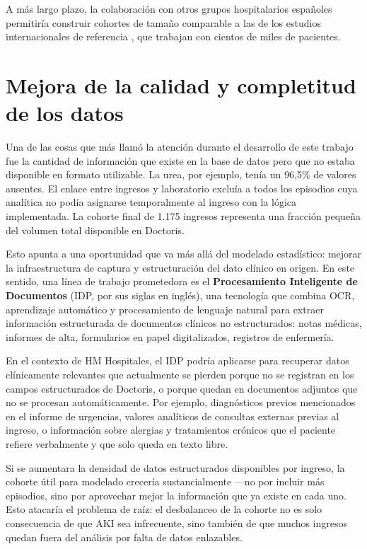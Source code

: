 \documentclass[12pt, a4paper, oneside]{report}
\begin{document}
A más largo plazo, la colaboración con otros grupos hospitalarios españoles permitiría construir cohortes de tamaño comparable a las de los estudios internacionales de referencia \parencite{tomasev2019nature, churpek2020validation}, que trabajan con cientos de miles de pacientes.

\section{Mejora de la calidad y completitud de los datos}

Una de las cosas que más llamó la atención durante el desarrollo de este trabajo fue la cantidad de información que existe en la base de datos pero que no estaba disponible en formato utilizable. La urea, por ejemplo, tenía un 96,5\% de valores ausentes. El enlace entre ingresos y laboratorio excluía a todos los episodios cuya analítica no podía asignarse temporalmente al ingreso con la lógica implementada. La cohorte final de 1.175 ingresos representa una fracción pequeña del volumen total disponible en Doctoris.

Esto apunta a una oportunidad que va más allá del modelado estadístico: mejorar la infraestructura de captura y estructuración del dato clínico en origen. En este sentido, una línea de trabajo prometedora es el \textbf{Procesamiento Inteligente de Documentos} (IDP, por sus siglas en inglés), una tecnología que combina OCR, aprendizaje automático y procesamiento de lenguaje natural para extraer información estructurada de documentos clínicos no estructurados: notas médicas, informes de alta, formularios en papel digitalizados, registros de enfermería.

En el contexto de HM Hospitales, el IDP podría aplicarse para recuperar datos clínicamente relevantes que actualmente se pierden porque no se registran en los campos estructurados de Doctoris, o porque quedan en documentos adjuntos que no se procesan automáticamente. Por ejemplo, diagnósticos previos mencionados en el informe de urgencias, valores analíticos de consultas externas previas al ingreso, o información sobre alergias y tratamientos crónicos que el paciente refiere verbalmente y que solo queda en texto libre.

Si se aumentara la densidad de datos estructurados disponibles por ingreso, la cohorte útil para modelado crecería sustancialmente —no por incluir más episodios, sino por aprovechar mejor la información que ya existe en cada uno. Esto atacaría el problema de raíz: el desbalanceo de la cohorte no es solo consecuencia de que AKI sea infrecuente, sino también de que muchos ingresos quedan fuera del análisis por falta de datos enlazables.
\end{document}
